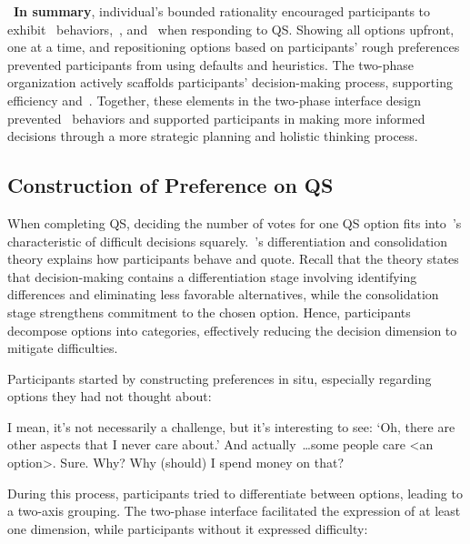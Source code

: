 ~\textbf{In summary}, individual's bounded rationality encouraged participants to exhibit~\underline{} behaviors,~\underline{}, and~\underline{} when responding to QS. Showing all options upfront, one at a time, and repositioning options based on participants' rough preferences prevented participants from using defaults and heuristics. The two-phase organization actively scaffolds participants' decision-making process, supporting efficiency \underline{} and~\underline{}. Together, these elements in the two-phase interface design prevented~\underline{} behaviors and supported participants in making more informed decisions through a more strategic planning and holistic thinking process.



\subsection{Construction of Preference on QS}

When completing QS, deciding the number of votes for one QS option fits into~\textcite{lichtensteinConstructionPreference2006}'s characteristic of difficult decisions squarely.~\textcite{svensonDifferentiationConsolidationTheory1992}'s differentiation and consolidation theory explains how participants behave and quote. Recall that the theory states that decision-making contains a differentiation stage involving identifying differences and eliminating less favorable alternatives, while the consolidation stage strengthens commitment to the chosen option. Hence, participants decompose options into categories, effectively reducing the decision dimension to mitigate difficulties.

Participants started by constructing preferences in situ, especially regarding options they had not thought about:
\begin{displayquote}

    I mean, it's not necessarily a challenge, but it's interesting to see: `Oh, there are other aspects that I never care about.' And actually~\ldots some people care <an option>. Sure. Why? Why (should) I spend money on that? \\\hfill{}
\end{displayquote}

During this process, participants tried to differentiate between options, leading to a two-axis grouping. The two-phase interface facilitated the expression of at least one dimension, while participants without it expressed difficulty:

